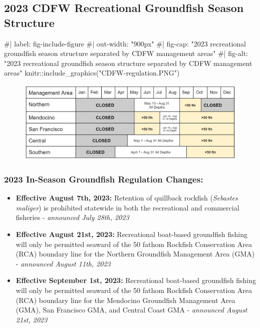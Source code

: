 \documentclass[
  letterpaper,
  DIV=11,
  numbers=noendperiod]{scrartcl}
\newenvironment{Shaded}{\begin{snugshade}}{\end{snugshade}}
\newcommand{\CommentTok}[1]{\textcolor[rgb]{0.37,0.37,0.37}{#1}}
\newcommand{\FunctionTok}[1]{\textcolor[rgb]{0.28,0.35,0.67}{#1}}
\newcommand{\NormalTok}[1]{\textcolor[rgb]{0.00,0.23,0.31}{#1}}
\newcommand{\SpecialCharTok}[1]{\textcolor[rgb]{0.37,0.37,0.37}{#1}}
\newcommand{\StringTok}[1]{\textcolor[rgb]{0.13,0.47,0.30}{#1}}
\begin{document}
\hypertarget{cdfw-recreational-groundfish-season-structure}{%
\subsection{2023 CDFW Recreational Groundfish Season
Structure}\label{cdfw-recreational-groundfish-season-structure}}

\begin{Shaded}
\begin{Highlighting}[]
\CommentTok{\#| label: fig{-}include{-}figure}
\CommentTok{\#| out{-}width: "900px"}
\CommentTok{\#| fig{-}cap: "2023 recreational groundfish season structure separated by CDFW management areas"}
\CommentTok{\#| fig{-}alt: "2023 recreational groundfish season structure separated by CDFW management areas"}
\NormalTok{knitr}\SpecialCharTok{::}\FunctionTok{include\_graphics}\NormalTok{(}\StringTok{"CDFW{-}regulation.PNG"}\NormalTok{)}
\end{Highlighting}
\end{Shaded}

\begin{figure}[H]

{\centering \includegraphics{CDFW-regulation.PNG}

}

\end{figure}

\hypertarget{in-season-groundfish-regulation-changes}{%
\subsubsection{2023 In-Season Groundfish Regulation
Changes:}\label{in-season-groundfish-regulation-changes}}

\begin{itemize}
\item
  \textbf{Effective August 7th, 2023:} Retention of quillback rockfish
  (\emph{Sebastes maliger}) is prohibited statewide in both the
  recreational and commercial fisheries - \emph{announced July 28th,
  2023}
\item
  \textbf{Effective August 21st, 2023:} Recreational boat-based
  groundfish fishing will only be permitted seaward of the 50 fathom
  Rockfish Conservation Area (RCA) boundary line for the Northern
  Groundfish Management Area (GMA) - \emph{announced August 11th, 2023}
\item
  \textbf{Effective September 1st, 2023:} Recreational boat-based
  groundfish fishing will only be permitted seaward of the 50 fathom
  Rockfish Conservation Area (RCA) boundary line for the Mendocino
  Groundfish Management Area (GMA), San Francisco GMA, and Central Coast
  GMA - \emph{announced August 21st, 2023}
\end{itemize}
\end{document}
